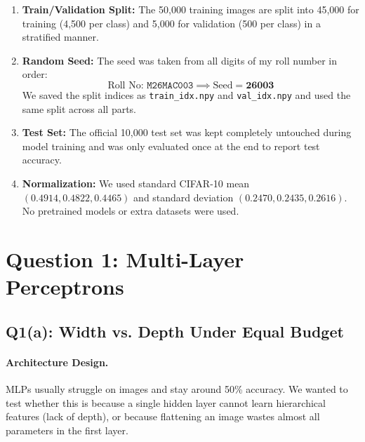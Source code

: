 \documentclass[10pt,twocolumn,letterpaper]{article}
\begin{document}
\begin{enumerate}
    \setlength{\itemsep}{1pt}
    \item \textbf{Train/Validation Split:} The 50,000 training images are split into 45,000 for training (4,500 per class) and 5,000 for validation (500 per class) in a stratified manner.
    \item \textbf{Random Seed:} The seed was taken from all digits of my roll number in order:
    \begin{equation*}
        \text{Roll No: } \texttt{M26MAC003} \implies \text{Seed} = \mathbf{26003}
    \end{equation*}
    We saved the split indices as \texttt{train\_idx.npy} and \texttt{val\_idx.npy} and used the same split across all parts.
    \item \textbf{Test Set:} The official 10,000 test set was kept completely untouched during model training and was only evaluated once at the end to report test accuracy.
    \item \textbf{Normalization:} We used standard CIFAR-10 mean $(0.4914, 0.4822, 0.4465)$ and standard deviation $(0.2470, 0.2435, 0.2616)$. No pretrained models or extra datasets were used.
\end{enumerate}

\section{Question 1: Multi-Layer Perceptrons}

\subsection{Q1(a): Width vs. Depth Under Equal Budget}

\paragraph{Architecture Design.}
MLPs usually struggle on images and stay around 50\% accuracy. We wanted to test whether this is because a single hidden layer cannot learn hierarchical features (lack of depth), or because flattening an image wastes almost all parameters in the first layer.
\end{document}
